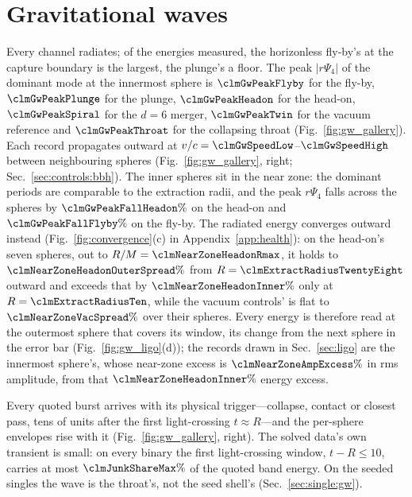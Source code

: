 \documentclass[twocolumn,floatfix,aps,prd,superscriptaddress,nofootinbib]{revtex4-2}
\begin{document}
\section{Gravitational waves}
\label{sec:gw}

Every channel radiates; of the energies measured, the horizonless fly-by's at the capture boundary is the largest, the plunge's a floor. The peak $|r\Psi_4|$ of the dominant mode at the innermost sphere is $\clmGwPeakFlyby$ for the fly-by, $\clmGwPeakPlunge$ for the plunge, $\clmGwPeakHeadon$ for the head-on, $\clmGwPeakSpiral$ for the $d=6$ merger, $\clmGwPeakTwin$ for the vacuum reference and $\clmGwPeakThroat$ for the collapsing throat (Fig.~\ref{fig:gw_gallery}). Each record propagates outward at $v/c=\clmGwSpeedLow$--$\clmGwSpeedHigh$ between neighbouring spheres (Fig.~\ref{fig:gw_gallery}, right; Sec.~\ref{sec:controls:bbh}). The inner spheres sit in the near zone: the dominant periods are comparable to the extraction radii, and the peak $r\Psi_4$ falls across the spheres by $\clmGwPeakFallHeadon\%$ on the head-on and $\clmGwPeakFallFlyby\%$ on the fly-by. The radiated energy converges outward instead (Fig.~\ref{fig:convergence}(c) in Appendix~\ref{app:health}): on the head-on's seven spheres, out to $R/M=\clmNearZoneHeadonRmax$, it holds to $\clmNearZoneHeadonOuterSpread\%$ from $R=\clmExtractRadiusTwentyEight$ outward and exceeds that by $\clmNearZoneHeadonInner\%$ only at $R=\clmExtractRadiusTen$, while the vacuum controls' is flat to $\clmNearZoneVacSpread\%$ over their spheres. Every energy is therefore read at the outermost sphere that covers its window, its change from the next sphere in the error bar (Fig.~\ref{fig:gw_ligo}(d)); the records drawn in Sec.~\ref{sec:ligo} are the innermost sphere's, whose near-zone excess is $\clmNearZoneAmpExcess\%$ in rms amplitude, from that $\clmNearZoneHeadonInner\%$ energy excess.

Every quoted burst arrives with its physical trigger---collapse, contact or closest pass, tens of units after the first light-crossing $t\approx R$---and the per-sphere envelopes rise with it (Fig.~\ref{fig:gw_gallery}, right). The solved data's own transient is small: on every binary the first light-crossing window, $t-R\le10$, carries at most $\clmJunkShareMax\%$ of the quoted band energy. On the seeded singles the wave is the throat's, not the seed shell's (Sec.~\ref{sec:single:gw}).
\end{document}
